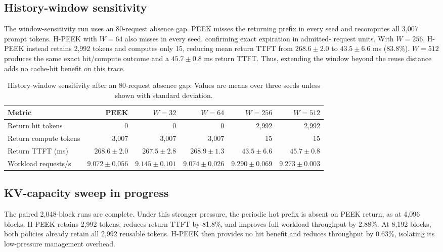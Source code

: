 \documentclass[10pt,twocolumn]{article}
\begin{document}
\subsection{History-window sensitivity}

The window-sensitivity run uses an 80-request absence gap. PEEK misses the
returning prefix in every seed and recomputes all 3,007 prompt tokens. H-PEEK
with $W=64$ also misses in every seed, confirming exact expiration in admitted-
request units. With $W=256$, H-PEEK instead retains 2,992 tokens and computes
only 15, reducing mean return TTFT from $268.6\pm2.0$ to $43.5\pm6.6$ ms
(83.8\%). $W=512$ produces the same exact hit/compute outcome and a
$45.7\pm0.8$ ms return TTFT. Thus, extending the window beyond the reuse
distance adds no cache-hit benefit on this trace.

\begin{table}[t]
  \centering
  \caption{History-window sensitivity after an 80-request absence gap. Values
  are means over three seeds unless shown with standard deviation.}
  \label{tab:window-progress}
  \begin{tabular}{lrrrrr}
    \toprule
    Metric & PEEK & $W=32$ & $W=64$ & $W=256$ & $W=512$ \\
    \midrule
    Return hit tokens & 0 & 0 & 0 & 2,992 & 2,992 \\
    Return compute tokens & 3,007 & 3,007 & 3,007 & 15 & 15 \\
    Return TTFT (ms) & $268.6\pm2.0$ & $267.5\pm2.8$ & $268.9\pm1.3$ & $43.5\pm6.6$ & $45.7\pm0.8$ \\
    Workload requests/s & $9.072\pm0.056$ & $9.145\pm0.101$ & $9.074\pm0.026$ & $9.290\pm0.069$ & $9.273\pm0.003$ \\
    \bottomrule
  \end{tabular}
\end{table}

\subsection{KV-capacity sweep in progress}

The paired 2,048-block runs are complete. Under this stronger pressure, the
periodic hot prefix is absent on PEEK return, as at 4,096 blocks. H-PEEK retains
2,992 tokens, reduces return TTFT by 81.8\%, and improves full-workload
throughput by 2.88\%. At 8,192 blocks, both policies already retain all 2,992
reusable tokens. H-PEEK then provides no hit benefit and reduces throughput by
0.63\%, isolating its low-pressure management overhead.
\end{document}
